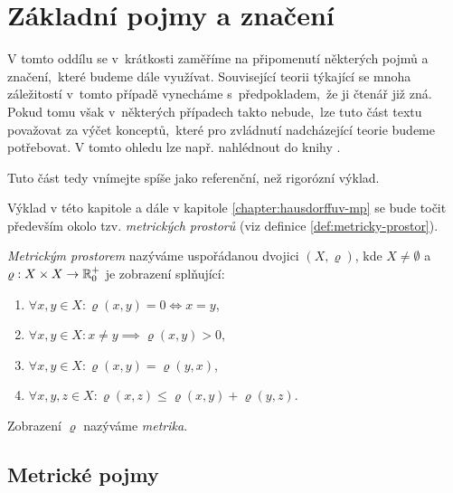 \section{Základní pojmy a značení}\label{sec:zakladni-pojmy-a-znaceni}

V tomto oddílu se v~krátkosti zaměříme na připomenutí některých pojmů a značení,~které budeme dále využívat. Související teorii týkající se mnoha záležitostí v~tomto případě vynecháme s~předpokladem,~že ji čtenář již zná. Pokud tomu však v~některých případech takto nebude,~lze tuto část textu považovat za výčet konceptů,~které pro zvládnutí nadcházející teorie budeme potřebovat. V tomto ohledu lze např. nahlédnout do knihy \cite{NetukaAnalyza2014}.

Tuto část tedy vnímejte spíše jako referenční, než rigorózní výklad.

Výklad v této kapitole a dále v kapitole \ref{chapter:hausdorffuv-mp} se bude točit především okolo tzv. \emph{metrických prostorů} (viz definice \ref{def:metricky-prostor}).
\begin{definition}\label{def:metricky-prostor}
    \emph{Metrickým prostorem} nazýváme uspořádanou dvojici $(X,\varrho)$, kde $X\neq\emptyset$ a $\varrho:X\times X \rightarrow \mathbb{R}_0^+$ je zobrazení splňující:
    \begin{enumerate}[label=(\alph*)]
        \item $\forall x,y\in X: \varrho(x,y)=0\iff x=y$,
        \item $\forall x,y\in X: x\neq y\implies \varrho(x,y)>0$,
        \item $\forall x,y\in X: \varrho(x,y)=\varrho(y,x)$,
        \item $\forall x,y,z\in X: \varrho(x,z)\leqslant\varrho(x,y)+\varrho(y,z)$.
    \end{enumerate}
    Zobrazení $\varrho$ nazýváme \emph{metrika}.
\end{definition}

\subsection{Metrické pojmy}\label{subsec:metricke-pojmy}

